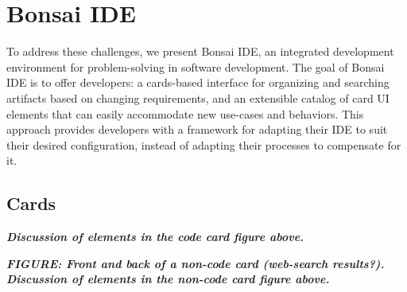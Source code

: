\documentclass{ppig}
\newcommand{\bold}[1]{\textit{\textbf{\color{aoblue}#1}}}
\begin{document}
\section{Bonsai IDE}
To address these challenges, we present Bonsai IDE, an integrated development environment for problem-solving in software development.
The goal of Bonsai IDE is to offer developers: a cards-based interface for organizing and searching artifacts based on changing requirements, and an extensible catalog of card UI elements that can easily accommodate new use-cases and behaviors.
This approach provides developers with a framework for adapting their IDE to suit their desired configuration, instead of adapting their processes to compensate for it.

\subsection{Cards}
\bold{Discussion of elements in the code card figure above.}

\bold{FIGURE: Front and back of a non-code card (web-search results?).}
\bold{Discussion of elements in the non-code card figure above.}
\end{document}

